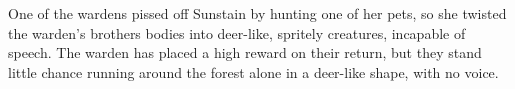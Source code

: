 \begin{multicols}{2}
\begin{itemize}
  One of the wardens pissed off Sunstain by hunting one of her pets, so she twisted the warden's brothers bodies into deer-like, spritely creatures, incapable of speech.
  The warden has placed a high reward on their return, but they stand little chance running around the forest alone in a deer-like shape, with no voice.
\end{itemize}

\vfill\null

\end{multicols}
